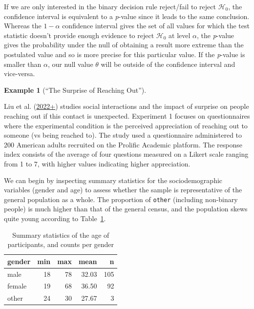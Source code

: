 \documentclass[
  11pt,
  letterpaper,
]{scrbook}
\theoremstyle{definition}
\newtheorem{example}{Example}[chapter]
\theoremstyle{remark}
\begin{document}
If we are only interested in the binary decision rule reject/fail to
reject \(\mathscr{H}_0\), the confidence interval is equivalent to a
\emph{p}-value since it leads to the same conclusion. Whereas the
\(1-\alpha\) confidence interval gives the set of all values for which
the test statistic doesn't provide enough evidence to reject
\(\mathscr{H}_0\) at level \(\alpha\), the \emph{p}-value gives the
probability under the null of obtaining a result more extreme than the
postulated value and so is more precise for this particular value. If
the \emph{p}-value is smaller than \(\alpha\), our null value \(\theta\)
will be outside of the confidence interval and vice-versa.

\begin{example}[``The Surprise of Reaching
Out'']\protect\hypertarget{exm-LiuRimMinMin2022E1}{}\label{exm-LiuRimMinMin2022E1}

Liu et al. (\protect\hyperlink{ref-Liu.Rim.Min.Min:2022}{2022+}) studies
social interactions and the impact of surprise on people reaching out if
this contact is unexpected. Experiment 1 focuses on questionnaires where
the experimental condition is the perceived appreciation of reaching out
to someone (vs being reached to). The study used a questionnaire
administered to 200 American adults recruited on the Prolific Academic
platform. The response index consists of the average of four questions
measured on a Likert scale ranging from 1 to 7, with higher values
indicating higher appreciation.

\end{example}

We can begin by inspecting summary statistics for the sociodemographic
variables (gender and age) to assess whether the sample is
representative of the general population as a whole. The proportion of
\texttt{other} (including non-binary people) is much higher than that of
the general census, and the population skews quite young according to
Table~\ref{tbl-LRMMS1-summarystat-a}.

\hypertarget{tbl-LRMMS1-summarystat-a}{}
\begin{table}
\caption{\label{tbl-LRMMS1-summarystat-a}Summary statistics of the age of participants, and counts per gender }\tabularnewline

\centering
\begin{tabular}{lrrrr}
\toprule
gender & min & max & mean & n\\
\midrule
male & 18 & 78 & 32.03 & 105\\
female & 19 & 68 & 36.50 & 92\\
other & 24 & 30 & 27.67 & 3\\
\bottomrule
\end{tabular}
\end{table}
\end{document}
